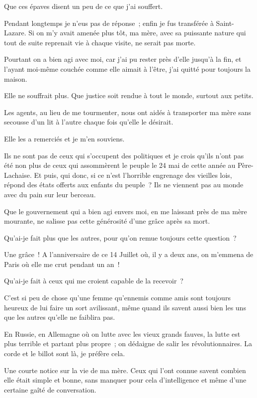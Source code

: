 \documentclass[french,twoside]{book} %
\begin{document}
\noindent Que ces épaves disent un peu de ce que j’ai souffert.\par
Pendant longtemps je n’eus pas de réponse ; enfin je fus transférée à Saint-Lazare. Si on m’y avait amenée plus tôt, ma mère, avec sa puissante nature qui tout de suite reprenait vie à chaque visite, ne serait pas morte.\par
Pourtant on a bien agi avec moi, car j’ai pu rester près d’elle jusqu’à la fin, et l’ayant moi-même couchée comme elle aimait à l’être, j’ai quitté pour toujours la maison.\par
Elle ne souffrait plus. Que justice soit rendue à tout le monde, surtout aux petits.\par
 Les agents, au lieu de me tourmenter, nous ont aidés à transporter ma mère sans secousse d’un lit à l’autre chaque fois qu’elle le désirait.\par
Elle les a remerciés et je m’en souviens.\par
Ils ne sont pas de ceux qui s’occupent des politiques et je crois qu’ils n’ont pas été non plus de ceux qui assommèrent le peuple le 24 mai de cette année au Père-Lachaise. Et puis, qui donc, si ce n’est l’horrible engrenage des vieilles lois, répond des états offerts aux enfants du peuple ? Ils ne viennent pas au monde avec du pain sur leur berceau.\par
Que le gouvernement qui a bien agi envers moi, en me laissant près de ma mère mourante, ne salisse pas cette générosité d’une grâce après sa mort.\par
Qu’ai-je fait plus que les autres, pour qu’on remue toujours cette question ?\par
Une grâce ! A l’anniversaire de ce 14 Juillet où, il y a deux ans, on m’emmena de Paris où elle me crut pendant un an !\par
Qu’ai-je fait à ceux qui me croient capable de la recevoir ?\par
C’est si peu de chose qu’une femme qu’ennemis comme amis sont toujours heureux de lui faire un sort avilissant, même quand ils savent aussi bien les uns que les autres qu’elle ne faiblira pas.\par
 En Russie, en Allemagne où on lutte avec les vieux grands fauves, la lutte est plus terrible et partant plus propre ; on dédaigne de salir les révolutionnaires. La corde et le billot sont là, je préfère cela.\par
Une courte notice sur la vie de ma mère. Ceux qui l’ont connue savent combien elle était simple et bonne, sans manquer pour cela d’intelligence et même d’une certaine gaîté de conversation.\par
\end{document}
